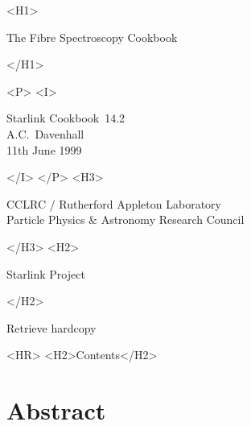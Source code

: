 \documentclass[twoside,11pt]{article}
\newcommand{\stardoccategory}  {Starlink Cookbook}
\newcommand{\stardocsource}    {sc\stardocnumber}
\newcommand{\stardocnumber}    {14.2}
\newcommand{\stardocauthors}   {A.C.~Davenhall}
\newcommand{\stardocdate}      {11th June 1999}
\newcommand{\stardoctitle}     {The Fibre Spectroscopy Cookbook}
\newcommand{\htmladdnormallink}[2]{#1}
\newcommand{\htmladdimg}[1]{}
\newcommand{\htmlref}[2]{#1}
\newcommand{\htmladdtonavigation}[1]{}
\newcommand{\xlabel}[1]{}
\newcommand{\latexonlytoc}[0]{\tableofcontents}
\begin{document}
\begin{htmlonly}
   \xlabel{}
   \begin{rawhtml} <H1> \end{rawhtml}
      \stardoctitle
   \begin{rawhtml} </H1> \end{rawhtml}


   \begin{rawhtml} <P> <I> \end{rawhtml}
   \stardoccategory\ \stardocnumber \\
   \stardocauthors \\
   \stardocdate
   \begin{rawhtml} </I> </P> <H3> \end{rawhtml}
      \htmladdnormallink{CCLRC}{http://www.cclrc.ac.uk} /
      \htmladdnormallink{Rutherford Appleton Laboratory}
                        {http://www.cclrc.ac.uk/ral} \\
      \htmladdnormallink{Particle Physics \& Astronomy Research Council}
                        {http://www.pparc.ac.uk} \\
   \begin{rawhtml} </H3> <H2> \end{rawhtml}
      \htmladdnormallink{Starlink Project}{http://star-www.rl.ac.uk/}
   \begin{rawhtml} </H2> \end{rawhtml}
   \htmladdnormallink{\htmladdimg{source.gif} Retrieve hardcopy}
      {http://star-www.rl.ac.uk/cgi-bin/hcserver?\stardocsource}\\

  \label{stardoccontents}
  \begin{rawhtml} 
    <HR>
    <H2>Contents</H2>
  \end{rawhtml}
  \newcommand{\latexonlytoc}[0]{}
  \htmladdtonavigation{\htmlref{\htmladdimg{contents_motif.gif}}
        {stardoccontents}}

  \section{\xlabel{abstract}Abstract}
\end{htmlonly}
\end{document}
